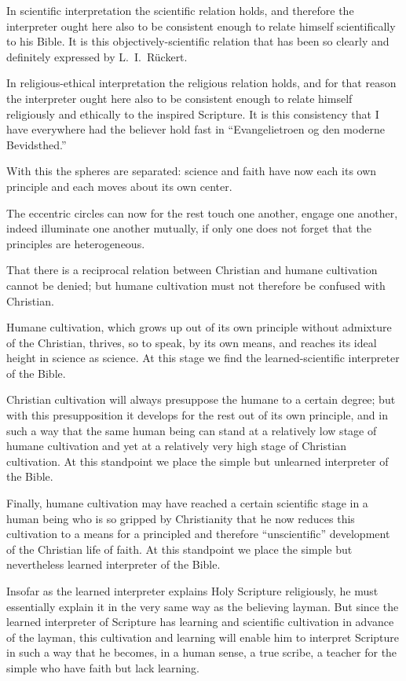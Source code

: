 \documentclass[12pt,a4paper]{book}
\begin{document}
In scientific interpretation the scientific relation holds, and therefore the
interpreter ought here also to be consistent enough to relate himself scientifically to
his Bible. It is this objectively-scientific relation that has been so clearly and
definitely expressed by L.\ I.\ Rückert.

In religious-ethical interpretation the religious relation holds, and for that reason
the interpreter ought here also to be consistent enough
to relate himself religiously and ethically to the inspired Scripture. It is this
consistency that I have everywhere had the believer hold fast in ``Evangelietroen og
den moderne Bevidsthed.''

With this the spheres are separated: science and faith have now each its own principle
and each moves about its own center.

The eccentric circles can now for the rest touch one another, engage one another,
indeed illuminate one another mutually, if only one does not forget that the principles
are heterogeneous.

That there is a reciprocal relation between Christian and humane cultivation cannot be
denied; but humane cultivation must not therefore be confused with Christian.

Humane cultivation, which grows up out of its own principle without admixture of the
Christian, thrives, so to speak, by its own means, and reaches its ideal height in
science as science. At this stage we find the learned-scientific interpreter of the
Bible.

Christian cultivation will always presuppose the humane to a certain degree; but with
this presupposition it develops for the rest out of its own principle, and in such a
way that the same human being can stand at a relatively low stage of humane cultivation
and yet at a relatively very high stage of Christian cultivation. At this standpoint we
place the simple but unlearned interpreter of the Bible.

Finally, humane cultivation may have reached a certain scientific stage in a human being
who is so gripped by Christianity that he now reduces this cultivation to a means for a
principled and therefore ``unscientific'' development of the Christian life of faith. At
this standpoint we place the simple but nevertheless learned interpreter of the Bible.

Insofar as the learned interpreter explains Holy Scripture religiously, he must
essentially explain it in the very same way as the believing layman. But since the
learned interpreter of Scripture has learning and scientific cultivation in advance of
the layman, this cultivation and learning will enable him to interpret Scripture in such
a way that he becomes, in a human sense, a true scribe, a teacher for the simple who have
faith but lack learning.
\end{document}
